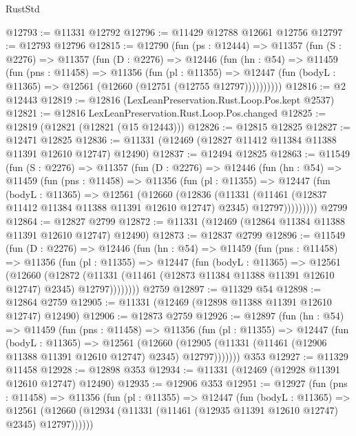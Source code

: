 \begin{lexlean}{RustStd}
\begin{coremodule}
@12793 := @11331 @12792
@12796 := @11429 @12788 @12661 @12756
@12797 := @12793 @12796
@12815 := @12790
    (fun (ps : @12444) =>
    @11357
      (fun (S : @2276) =>
      @11357
        (fun (D : @2276) =>
        @12446
          (fun (hn : @54) =>
          @11459
            (fun (pns : @11458) =>
            @11356
              (fun (pl : @11355) =>
              @12447 (fun (bodyL : @11365) => @12561 (@12660 (@12751 (@12755 @12797))))))))))
@12816 := @2 @12443
@12819 := @12816 (LexLeanPreservation.Rust.Loop.Pos.kept @2537)
@12821 := @12816 LexLeanPreservation.Rust.Loop.Pos.changed
@12825 := @12819 (@12821 (@12821 (@15 @12443)))
@12826 := @12815 @12825
@12827 := @12471 @12825
@12836 := @11331 (@12469 (@12827 @11412 @11384 @11388 @11391 @12610 @12747) @12490)
@12837 := @12494 @12825
@12863 := @11549
    (fun (S : @2276) =>
    @11357
      (fun (D : @2276) =>
      @12446
        (fun (hn : @54) =>
        @11459
          (fun (pns : @11458) =>
          @11356
            (fun (pl : @11355) =>
            @12447
              (fun (bodyL : @11365) =>
              @12561
                (@12660
                  (@12836
                    (@11331
                      (@11461 (@12837 @11412 @11384 @11388 @11391 @12610 @12747) @2345)
                      @12797)))))))))
    @2799
@12864 := @12827 @2799
@12872 := @11331 (@12469 (@12864 @11384 @11388 @11391 @12610 @12747) @12490)
@12873 := @12837 @2799
@12896 := @11549
    (fun (D : @2276) =>
    @12446
      (fun (hn : @54) =>
      @11459
        (fun (pns : @11458) =>
        @11356
          (fun (pl : @11355) =>
          @12447
            (fun (bodyL : @11365) =>
            @12561
              (@12660
                (@12872
                  (@11331 (@11461 (@12873 @11384 @11388 @11391 @12610 @12747) @2345) @12797))))))))
    @2759
@12897 := @11329 @54
@12898 := @12864 @2759
@12905 := @11331 (@12469 (@12898 @11388 @11391 @12610 @12747) @12490)
@12906 := @12873 @2759
@12926 := @12897
    (fun (hn : @54) =>
    @11459
      (fun (pns : @11458) =>
      @11356
        (fun (pl : @11355) =>
        @12447
          (fun (bodyL : @11365) =>
          @12561
            (@12660
              (@12905 (@11331 (@11461 (@12906 @11388 @11391 @12610 @12747) @2345) @12797)))))))
    @353
@12927 := @11329 @11458
@12928 := @12898 @353
@12934 := @11331 (@12469 (@12928 @11391 @12610 @12747) @12490)
@12935 := @12906 @353
@12951 := @12927
    (fun (pns : @11458) =>
    @11356
      (fun (pl : @11355) =>
      @12447
        (fun (bodyL : @11365) =>
        @12561 (@12660 (@12934 (@11331 (@11461 (@12935 @11391 @12610 @12747) @2345) @12797))))))

\end{coremodule}
\end{lexlean}
